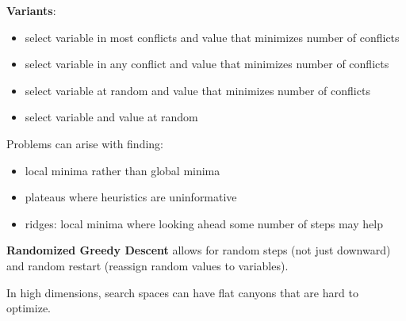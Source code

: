 \documentclass[11pt]{article}
\begin{document}
\begin{center}
\end{center}

\textbf{Variants}:
\begin{itemize}
\item select variable in most conflicts and value that minimizes number of conflicts
\item select variable in any conflict and value that minimizes number of conflicts
\item select variable at random and value that minimizes number of conflicts
\item select variable and value at random
\end{itemize}

Problems can arise with finding:
\begin{itemize}
\item local minima rather than global minima
\item plateaus where heuristics are uninformative
\item ridges: local minima where looking ahead some number of steps may help
\end{itemize}

\textbf{Randomized Greedy Descent} allows for random steps (not just downward) and random restart
(reassign random values to variables).

In high dimensions, search spaces can have flat canyons that are hard to optimize.
\end{document}
